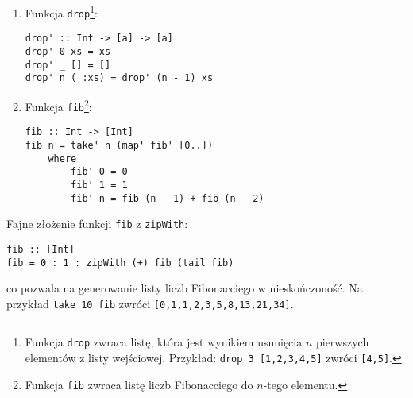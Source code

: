 \documentclass[11pt,a4paper]{article}
\begin{document}
\begin{enumerate}
\begin{Verbatim}[frame=single]
take' :: Int -> [a] -> [a]
take' 0 _ = []
take' _ [] = []
take' n (x:xs) = x : take' (n - 1) xs
        \end{Verbatim}
    \item Funkcja \texttt{drop}\footnote{Funkcja \texttt{drop} zwraca listę, która jest wynikiem usunięcia \( n \) pierwszych elementów z listy wejściowej. \newline
        Przykład: \texttt{drop 3 [1,2,3,4,5]} zwróci \texttt{[4,5]}.}:
        \begin{Verbatim}[frame=single]
drop' :: Int -> [a] -> [a]
drop' 0 xs = xs
drop' _ [] = []
drop' n (_:xs) = drop' (n - 1) xs
        \end{Verbatim}
    \item Funkcja \texttt{fib}\footnote{Funkcja \texttt{fib} zwraca listę liczb Fibonacciego do \( n \)-tego elementu.}:
        \begin{Verbatim}[frame=single]
fib :: Int -> [Int]
fib n = take' n (map' fib' [0..])
    where
        fib' 0 = 0
        fib' 1 = 1
        fib' n = fib (n - 1) + fib (n - 2)
        \end{Verbatim}
\end{enumerate}
Fajne złożenie funkcji \texttt{fib} z \texttt{zipWith}:
\begin{Verbatim}[frame=single]
fib :: [Int]
fib = 0 : 1 : zipWith (+) fib (tail fib)
\end{Verbatim}
co pozwala na generowanie listy liczb Fibonacciego w nieskończoność.
Na przykład \texttt{take 10 fib} zwróci \texttt{[0,1,1,2,3,5,8,13,21,34]}.
\end{document}

